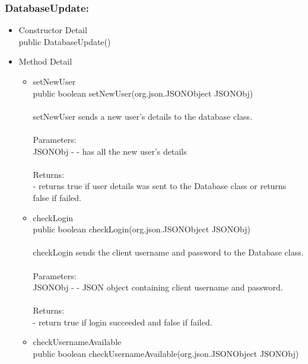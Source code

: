 \documentclass[letterpaper]{article}
\begin{document}
								\vspace{0.2in}
								\subsubsection*{DatabaseUpdate:}
								\vspace{0.1in}	
									\begin{itemize}
										\item	Constructor Detail \\
												public DatabaseUpdate()
										\item	Method Detail
												\begin{itemize}
													\item	setNewUser \\
															public boolean setNewUser(org.json.JSONObject JSONObj) \\ \\
															setNewUser sends a new user's details to the database class. \\ \\
															Parameters: \\
															JSONObj - - has all the new user's details \\ \\
															Returns: \\
															- returns true if user details was sent to the Database class or returns false if failed.
													\item	checkLogin \\
															public boolean checkLogin(org.json.JSONObject JSONObj) \\ \\
															checkLogin sends the client username and password to the Database class. \\ \\
															Parameters: \\
															JSONObj - - JSON object containing client username and password. \\ \\
															Returns: \\
															- return true if login succeeded and false if failed.
													\item	checkUsernameAvailable \\
															public boolean checkUsernameAvailable(org.json.JSONObject JSONObj) \\ \\

\end{itemize}
\end{itemize}
\end{document}
